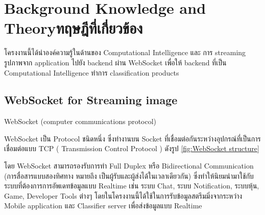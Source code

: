 \chapter{\ifenglish Background Knowledge and Theory\else ทฤษฎีที่เกี่ยวข้อง\fi}

\par โครงงานนี้ได้นำองค์ความรู้ในด้านของ Computational Intelligence และ การ streaming
รูปภาพจาก application ไปยัง backend ผ่าน WebSocket   เพื่อให้ backend
ที่เป็น Computational Intelligence ทำการ classification products


\section{WebSocket for Streaming image \cite{WebSocket}}
\par WebSocket (computer communications protocol)

WebSocket เป็น Protocol ชนิดหนึ่ง ซึ่งทำงานบน Socket ที่เชื่อมต่อกันระหว่างอุปกรณ์ที่เป็นการเชื่อมต่อแบบ
 TCP ( Transmission Control Protocol ) ดังรูป \ref{fig:WebSocket structure}

โดย WebSocket สามารถรองรับการทำ Full Duplex หรือ Bidirectional Communication (การสื่อสารแบบสองทิศทาง หมายถึง เป็นผู้รับและผู้ส่งได้ในเวลาเดียวกัน)
ซึ่งทำให้นิยมนำมาใช้กับระบบที่ต้องการการอัพเดทข้อมูลแบบ Realtime เช่น ระบบ Chat, ระบบ Notification, ระบบหุ้น, Game, Developer Tools ต่างๆ
โดยในโครงงานนี้ได้ใช้ในการรับข้อมูลสตรีมมิ่งจากระหว่าง Mobile application และ  Classifier server เพื่อส่งข้อมูลแบบ Realtime

